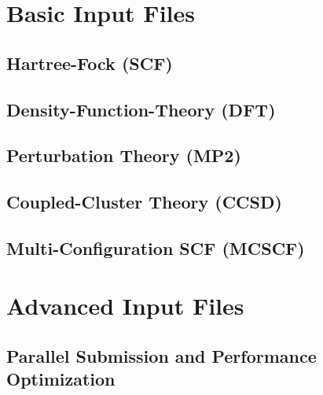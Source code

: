 \documentclass[letterpaper,12pt]{article}
\begin{document}
\newpage

\section{Basic Input Files}\label{sec:BasisInputFiles}

\newpage

\subsection{Hartree-Fock (SCF)}\label{sec:HartreeFock}

\newpage

\subsection{Density-Function-Theory (DFT)}\label{sec:DensityFunctionTheory}

\newpage

\subsection{Perturbation Theory (MP2)}\label{sec:PerturbationTheory}

\newpage

\subsection{Coupled-Cluster Theory (CCSD)}\label{sec:CoupledClusterTheory}

\newpage

\subsection{Multi-Configuration SCF (MCSCF)}\label{sec:MultiConfigurationSCF}

\newpage

\section{Advanced Input Files}\label{sec:AdvancedInputFiles}

\newpage

\subsection{Parallel Submission and Performance Optimization}\label{sec:ParallelPerformance}

\newpage
\end{document}
